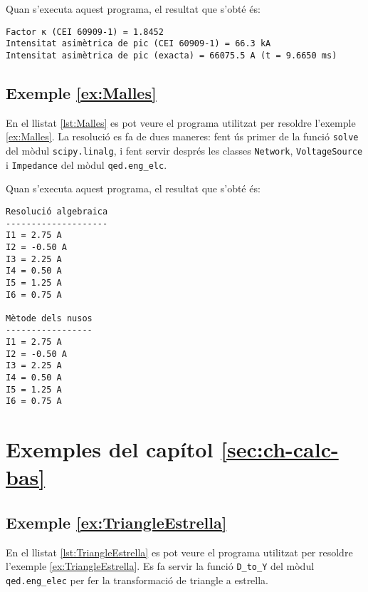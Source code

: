 Quan s'executa aquest programa, el resultat que s'obté és:
\lstset{
	language=,
	numbers=none,
	frame=none
}
\begin{lstlisting}
Factor κ (CEI 60909-1) = 1.8452
Intensitat asimètrica de pic (CEI 60909-1) = 66.3 kA
Intensitat asimètrica de pic (exacta) = 66075.5 A (t = 9.6650 ms)
\end{lstlisting}


\hypertarget{exemple:Malles}{\subsection{Exemple \ref*{ex:Malles} \Malles}}
En el llistat \vref{lst:Malles} es pot veure el programa utilitzat per resoldre l'exemple \vref{ex:Malles}. La resolució es fa de dues maneres: fent ús  primer de la funció \texttt{solve} del mòdul \texttt{scipy.linalg}, i fent servir després les classes \texttt{Network}, \texttt{VoltageSource} i \texttt{Impedance} del mòdul \texttt{qed.eng\_elc}.


Quan s'executa aquest programa, el resultat que s'obté és:
\lstset{
	language=,
	numbers=none,
	frame=none
}
\begin{lstlisting}
Resolució algebraica
--------------------
I1 = 2.75 A
I2 = -0.50 A
I3 = 2.25 A
I4 = 0.50 A
I5 = 1.25 A
I6 = 0.75 A

Mètode dels nusos
-----------------
I1 = 2.75 A
I2 = -0.50 A
I3 = 2.25 A
I4 = 0.50 A
I5 = 1.25 A
I6 = 0.75 A
\end{lstlisting} 



\section{Exemples del capítol \ref*{sec:ch-calc-bas}}

\hypertarget{exemple:TriangleEstrella}{\subsection{Exemple \ref*{ex:TriangleEstrella} \TriangleEstrella}}
En el llistat \vref{lst:TriangleEstrella} es pot veure el programa utilitzat per resoldre l'exemple \vref{ex:TriangleEstrella}. Es fa servir la funció \texttt{D\_to\_Y} del mòdul \texttt{qed.eng\_elec} per fer la transformació de triangle a estrella.


